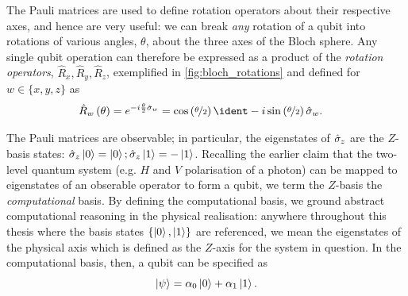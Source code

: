 The Pauli matrices are used to define rotation operators about 
    their respective axes, and hence are very useful:
    we can break \emph{any} rotation of a qubit into rotations of various angles, $\theta$, about the three axes of the Bloch sphere.
Any single qubit operation can therefore be expressed as a product of
    the \emph{rotation operators}, $\hat{R}_x, \hat{R}_y, \hat{R}_z$, exemplified in \cref{fig:bloch_rotations} and defined for $w \in \{ x,y,z\}$ as
\begin{equation}
    \label{eqn:rotation_operator}
    \begin{split}
        \hat{R}_w\left(\theta\right) &= e^{-i \frac{\theta}{2} \hat{\sigma}_w} 
        = \cos\left(\nicefrac{\theta}{2}\right) \ident - i \sin \left(\nicefrac{\theta}{2}\right) \hat{\sigma}_w.
    \end{split}
\end{equation}
    
\par
The Pauli matrices are observable; 
    in particular, the eigenstates of $\hat{\sigma}_{z}$ are the $Z$-basis states:
    $\hat{\sigma}_{z} \ket{0} = \ket{0}; \hat{\sigma}_{z} \ket{1} = - \ket{1}$.
Recalling the earlier claim that the two-level quantum system (e.g. $H$ and $V$ polarisation of a photon)
    can be mapped to eigenstates of an obserable operator to form a qubit, 
    we term the $Z$-basis the \emph{computational} basis.
By defining the computational basis, we ground abstract computational reasoning in the physical realisation:
    anywhere throughout this thesis where the basis states $\{\ket{0}, \ket{1}\}$ are referenced, 
    we mean the eigenstates of the physical axis which is defined as the $Z$-axis for the system in question. 
In the computational basis, then, a qubit can be specified as
\begin{equation}
    \label{eqn:computational_qubit}
    \ket{\psi} = \alpha_0 \ket{0} + \alpha_1 \ket{1}.
\end{equation}

